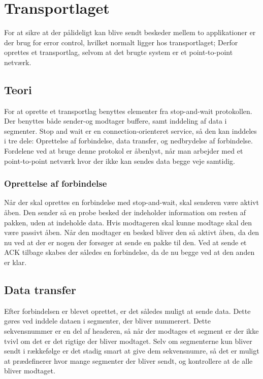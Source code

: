 \section{Transportlaget}

For at sikre at der pålideligt kan blive sendt beskeder mellem to applikationer er der brug for error control, hvilket normalt ligger hos transportlaget; Derfor oprettes et transportlag, selvom at det brugte system er et point-to-point netværk.

\subsection{Teori}
For at oprette et transportlag benyttes elementer fra stop-and-wait protokollen. Der benyttes både sender-og modtager buffere, samt inddeling af data i segmenter. Stop and wait er en connection-orienteret service, så den kan inddeles i tre dele: Oprettelse af forbindelse, data transfer, og nedbrydelse af forbindelse. Fordelene ved at bruge denne protokol er åbenlyst, når man arbejder med et point-to-point netværk hvor der ikke kan sendes data begge veje samtidig.

\subsubsection{Oprettelse af forbindelse}

Når der skal oprettes en forbindelse med stop-and-wait, skal senderen være aktivt åben. Den sender så en probe besked der indeholder information om resten af pakken, uden at indeholde data. Hvis modtageren skal kunne modtage skal den være passivt åben. Når den modtager en besked bliver den så aktivt åben, da den nu ved at der er nogen der forsøger at sende en pakke til den. Ved at sende et ACK tilbage skabes der således en forbindelse, da de nu begge ved at den anden er klar.

\subsection{Data transfer}

Efter forbindelsen er blevet oprettet, er det således muligt at sende data. Dette gøres ved inddele dataen i segmenter, der bliver nummerert. Dette sekvensnummer er en del af headeren, så når der modtages et segment er der ikke tvivl om det er det rigtige der bliver modtaget. Selv om segmenterne kun bliver sendt i rækkefølge er det stadig smart at give dem sekvensnumre, så det er muligt at prædefinerer hvor mange segmenter der bliver sendt, og kontrollere at de alle bliver modtaget.

